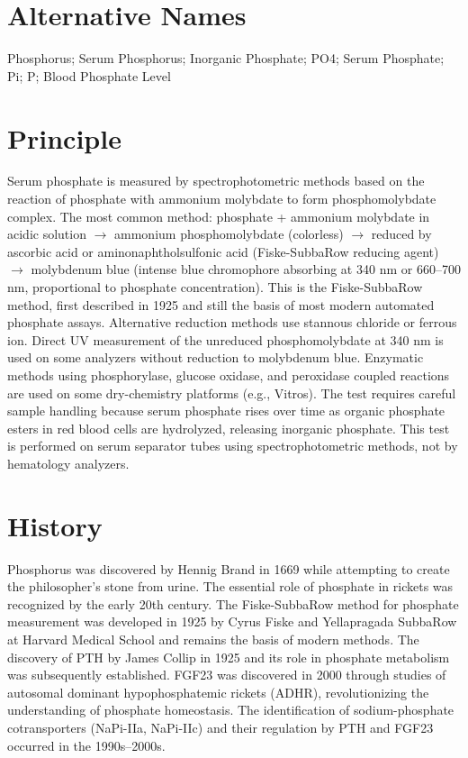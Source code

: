 \section*{Alternative Names}
Phosphorus; Serum Phosphorus; Inorganic Phosphate; PO4; Serum Phosphate; Pi; P; Blood Phosphate Level

\section*{Principle}
Serum phosphate is measured by spectrophotometric methods based on the reaction of phosphate with ammonium molybdate to form phosphomolybdate complex. The most common method: phosphate + ammonium molybdate in acidic solution $\rightarrow$ ammonium phosphomolybdate (colorless) $\rightarrow$ reduced by ascorbic acid or aminonaphtholsulfonic acid (Fiske-SubbaRow reducing agent) $\rightarrow$ molybdenum blue (intense blue chromophore absorbing at 340 nm or 660--700 nm, proportional to phosphate concentration). This is the Fiske-SubbaRow method, first described in 1925 and still the basis of most modern automated phosphate assays. Alternative reduction methods use stannous chloride or ferrous ion. Direct UV measurement of the unreduced phosphomolybdate at 340 nm is used on some analyzers without reduction to molybdenum blue. Enzymatic methods using phosphorylase, glucose oxidase, and peroxidase coupled reactions are used on some dry-chemistry platforms (e.g., Vitros). The test requires careful sample handling because serum phosphate rises over time as organic phosphate esters in red blood cells are hydrolyzed, releasing inorganic phosphate. This test is performed on serum separator tubes using spectrophotometric methods, not by hematology analyzers.

\section*{History}
Phosphorus was discovered by Hennig Brand in 1669 while attempting to create the philosopher's stone from urine. The essential role of phosphate in rickets was recognized by the early 20th century. The Fiske-SubbaRow method for phosphate measurement was developed in 1925 by Cyrus Fiske and Yellapragada SubbaRow at Harvard Medical School and remains the basis of modern methods. The discovery of PTH by James Collip in 1925 and its role in phosphate metabolism was subsequently established. FGF23 was discovered in 2000 through studies of autosomal dominant hypophosphatemic rickets (ADHR), revolutionizing the understanding of phosphate homeostasis. The identification of sodium-phosphate cotransporters (NaPi-IIa, NaPi-IIc) and their regulation by PTH and FGF23 occurred in the 1990s--2000s.

